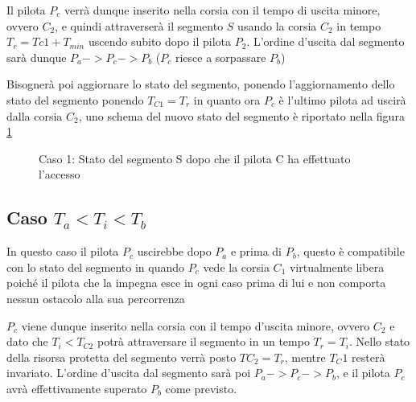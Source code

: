 \documentclass[a4paper,11pt, twoside]{book}
\begin{document}
	Il pilota $P_{c}$ verrà dunque inserito nella corsia con il tempo di uscita minore, ovvero $C_2$,
	e quindi attraverserà il segmento $S$ usando la corsia $C_2$ in tempo $T_r = T{c1} + T_{min}$
	uscendo subito dopo il pilota $P_2$. L'ordine d'uscita dal segmento sarà dunque $P_a -> P_c -> P_b$
	($P_c$ riesce a sorpassare $P_b$)
	
	Bisognerà poi aggiornare lo stato del segmento, ponendo l'aggiornamento dello stato del segmento ponendo
	$T_{C1} = T_{r}$ in quanto ora $P_c$ è l'ultimo pilota ad uscirà dalla corsia $C_2$, uno schema del
	nuovo stato del segmento è riportato nella figura \ref{fgr:AccessoSegmentiCaso1}
	
	\begin{figure}[ht]
	  \centering
	  \caption{Caso 1: Stato del segmento S dopo che il pilota C ha effettuato l'accesso}
	  \label{fgr:AccessoSegmentiCaso1}
	\end{figure}
	
      \subsection{Caso $T_a < T_i < T_b$}
	In questo caso il pilota $P_c$ uscirebbe dopo $P_a$ e prima di $P_b$, questo è compatibile con 
	lo stato del segmento in quando $P_c$ vede la corsia $C_1$ virtualmente libera poiché
	il pilota che la impegna esce in ogni caso prima di lui e non comporta nessun ostacolo alla sua percorrenza
	
	$P_c$ viene dunque inserito nella corsia con il tempo d'uscita minore, ovvero $C_2$ e dato che
	$T_i < T_{C2}$ potrà attraversare il segmento in un tempo $T_r = T_i$. 
	Nello stato della risorsa protetta del segmento verrà posto $TC_2 = T_r$, mentre $T_C1$ resterà invariato.
	L'ordine d'uscita dal segmento sarà poi $P_a -> P_c -> P_b$, e il pilota $P_c$ avrà effettivamente 
	superato $P_b$ come previsto.
	
\end{document}
